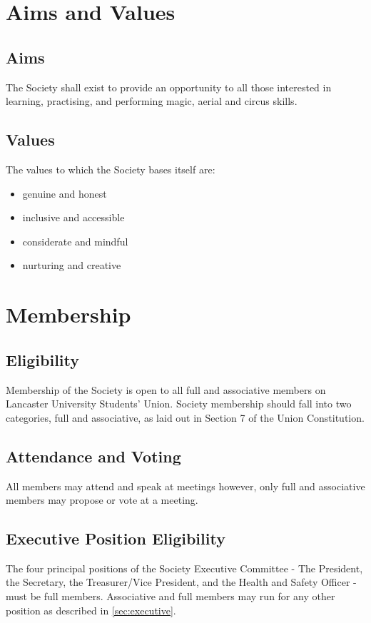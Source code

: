 \documentclass[11pt,a4paper]{article}
\begin{document}
\section{Aims and Values}
\subsection{Aims}
The Society shall exist to provide an opportunity to all those interested in learning, practising, and performing magic, aerial and circus skills.

\subsection{Values}
The values to which the Society bases itself are:
\begin{itemize}
    \item genuine and honest
    \item inclusive and accessible
    \item considerate and mindful
    \item nurturing and creative
\end{itemize}

\section{Membership}\label{sec:membership}
\subsection{Eligibility}
Membership of the Society is open to all full and associative members on Lancaster University Students’ Union. Society membership should fall into two categories, full and associative, as laid out in Section 7 of the Union Constitution.

\subsection{Attendance and Voting}
All members may attend and speak at meetings however, only full and associative members may propose or vote at a meeting.

\subsection{Executive Position Eligibility}
The four principal positions of the Society Executive Committee - The President, the Secretary, the Treasurer/Vice President, and the Health and Safety Officer - must be full members. Associative and full members may run for any other position as described in \autoref{sec:executive}.
\end{document}
